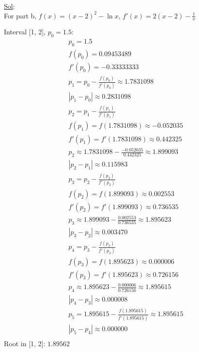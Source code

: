 \begin{enumerate}
\begin{enumerate}
        \underline{Sol}:\\
        For part b, \( f(x) = (x - 2)^2 - \ln x \), \( f'(x) = 2(x -
        2) - \frac{1}{x} \)

        Interval [1, 2], \( p_0 = 1.5 \):
        \[
          \begin{array}{l}
            p_0 = 1.5 \\
            f(p_0) = 0.09453489 \\
            f'(p_0) = -0.33333333 \\
            p_1 = p_0 - \frac{f(p_0)}{f'(p_0)} \approx 1.7831098 \\
            |p_1 - p_0| \approx 0.2831098 \\
            p_2 = p_1 - \frac{f(p_1)}{f'(p_1)} \\
            f(p_1) = f(1.7831098) \approx -0.052035 \\
            f'(p_1) = f'(1.7831098) \approx 0.442325 \\
            p_2 \approx 1.7831098 - \frac{-0.052035}{0.442325}
            \approx 1.899093 \\
            |p_2 - p_1| \approx 0.115983 \\
            p_3 = p_2 - \frac{f(p_2)}{f'(p_2)} \\
            f(p_2) = f(1.899093) \approx 0.002553 \\
            f'(p_2) = f'(1.899093) \approx 0.736535 \\
            p_3 \approx 1.899093 - \frac{0.002553}{0.736535} \approx 1.895623 \\
            |p_3 - p_2| \approx 0.003470 \\
            p_4 = p_3 - \frac{f(p_3)}{f'(p_3)} \\
            f(p_3) = f(1.895623) \approx 0.000006 \\
            f'(p_3) = f'(1.895623) \approx 0.726156 \\
            p_4 \approx 1.895623 - \frac{0.000006}{0.726156} \approx 1.895615 \\
            |p_4 - p_3| \approx 0.000008 \\
            p_5 = 1.895615 - \frac{f(1.895615)}{f'(1.895615)} \approx
            1.895615 \\
            |p_5 - p_4| \approx 0.000000 \\
          \end{array}
        \]
        Root in [1, 2]: \( \boxed{1.89562} \)


\end{enumerate}
\end{enumerate}
